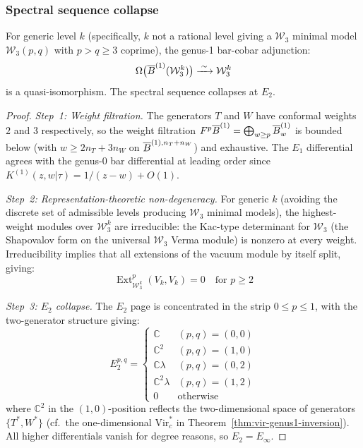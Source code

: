 \subsubsection{Spectral sequence collapse}

\begin{theorem}
\label{thm:w3-genus1-inversion}
For generic level $k$ (specifically, $k$ not a rational level giving a
$\mathcal{W}_3$ minimal model $\mathcal{W}_3(p,q)$ with $p > q \geq 3$
coprime), the genus-1 bar-cobar adjunction:
\begin{equation}
\Omega\bigl(\overline{B}^{(1)}(\mathcal{W}_3^k)\bigr)
  \xrightarrow{\;\sim\;} \mathcal{W}_3^k
\end{equation}
is a quasi-isomorphism.  The spectral sequence collapses at $E_2$.
\end{theorem}

\begin{proof}
\emph{Step~1: Weight filtration.}
The generators $T$ and $W$ have conformal weights $2$ and $3$
respectively, so the weight filtration
$F^p\overline{B}^{(1)} = \bigoplus_{w \geq p} \overline{B}^{(1)}_w$ is bounded below
(with $w \geq 2n_T + 3n_W$ on $\overline{B}^{(1),n_T+n_W}$) and exhaustive.
The $E_1$ differential agrees with the genus-0 bar differential at
leading order since
$K^{(1)}(z,w|\tau) = 1/(z-w) + O(1)$.

\emph{Step~2: Representation-theoretic non-degeneracy.}
For generic $k$ (avoiding the discrete set of admissible levels
producing $\mathcal{W}_3$ minimal models), the highest-weight
modules over $\mathcal{W}_3^k$ are irreducible: the Kac-type
determinant for $\mathcal{W}_3$ (the Shapovalov form on the
universal $\mathcal{W}_3$ Verma module) is nonzero at every weight.
Irreducibility implies that all extensions of the vacuum module by
itself split, giving:
\begin{equation}
\operatorname{Ext}^p_{\mathcal{W}_3^k}(V_k, V_k) = 0
  \quad \text{for } p \geq 2
\end{equation}

\emph{Step~3: $E_2$ collapse.}
The $E_2$ page is concentrated in the strip $0 \leq p \leq 1$, with the
two-generator structure giving:
\begin{equation}
E_2^{p,q} = \begin{cases}
\mathbb{C} & (p,q) = (0,0) \\
\mathbb{C}^2 & (p,q) = (1,0) \\
\mathbb{C}\lambda & (p,q) = (0,2) \\
\mathbb{C}^2 \lambda & (p,q) = (1,2) \\
0 & \text{otherwise}
\end{cases}
\end{equation}
where $\mathbb{C}^2$ in the $(1,0)$-position reflects the two-dimensional
space of generators $\{T^*, W^*\}$ (cf.\ the one-dimensional
$\mathrm{Vir}_c^*$ in Theorem~\ref{thm:vir-genus1-inversion}).
All higher differentials vanish for degree reasons, so
$E_2 = E_\infty$.
\end{proof}

